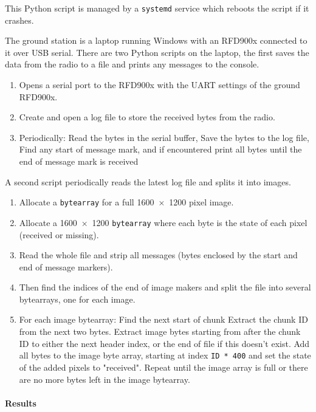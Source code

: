 \documentclass[a4paper,11pt]{article}
\begin{document}
This Python script is managed by a \texttt{systemd} service which reboots the script if it crashes.

The ground station is a laptop running Windows with an RFD900x connected to it over USB serial. There are two Python scripts on the laptop, the first saves the data from the radio to a file and prints any messages to the console.

\begin{enumerate}
  \item Opens a serial port to the RFD900x with the UART settings of the ground RFD900x.
  \item Create and open a log file to store the received bytes from the radio.
  \item Periodically:
        \subitem Read the bytes in the serial buffer,
        \subitem Save the bytes to the log file,
        \subitem Find any start of message mark, and if encountered print all bytes until the end of message mark is received
\end{enumerate}

A second script periodically reads the latest log file and splits it into images.

\begin{enumerate}
  \item Allocate a \texttt{bytearray} for a full \SI{1600x1200}{} pixel image.
  \item Allocate a \SI{1600x1200}{} \texttt{bytearray} where each byte is the state of each pixel (received or missing).
  \item Read the whole file and strip all messages (bytes enclosed by the start and end of message markers).
  \item Then find the indices of the end of image makers and split the file into several bytearrays, one for each image.
  \item For each image bytearray:
        \subitem Find the next start of chunk
        \subitem Extract the chunk ID from the next two bytes.
        \subitem Extract image bytes starting from after the chunk ID to either the next header index, or the end of file if this doesn't exist.
        \subitem Add all bytes to the image byte array, starting at index \texttt{ID * 400} and set the state of the added pixels to "received".
        \subitem Repeat until the image array is full or there are no more bytes left in the image bytearray.
\end{enumerate}

\paragraph{Results}
\end{document}
